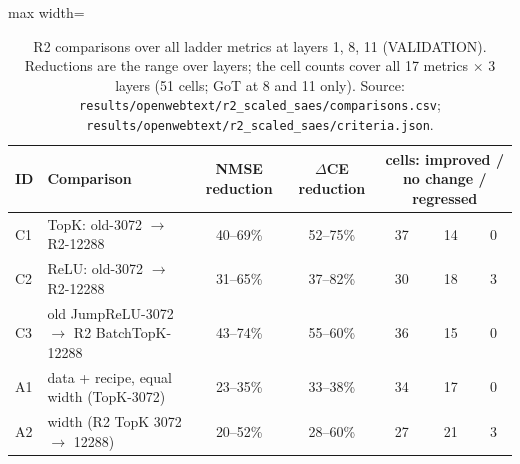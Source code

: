 \begin{table}[t]
\centering
\small
\caption{R2 comparisons over all ladder metrics at layers 1, 8, 11 (VALIDATION). Reductions are the range over layers; the cell counts cover all 17 metrics $\times$ 3 layers (51 cells; GoT at 8 and 11 only). Source: \texttt{results/\allowbreak{}openwebtext/\allowbreak{}r2\_scaled\_saes/\allowbreak{}comparisons.csv}; \texttt{results/\allowbreak{}openwebtext/\allowbreak{}r2\_scaled\_saes/\allowbreak{}criteria.json}.}
\label{tab:r2_counts}
\begin{adjustbox}{max width=\linewidth}
\begin{tabular}{llccccc}
\toprule
ID & Comparison & NMSE reduction & $\Delta$CE reduction & \multicolumn{3}{c}{cells: improved / no change / regressed} \\
\midrule
C1 & TopK: old-3072 $\rightarrow$ R2-12288 & 40--69\% & 52--75\% & 37 & 14 & 0 \\
C2 & ReLU: old-3072 $\rightarrow$ R2-12288 & 31--65\% & 37--82\% & 30 & 18 & 3 \\
C3 & old JumpReLU-3072 $\rightarrow$ R2 BatchTopK-12288 & 43--74\% & 55--60\% & 36 & 15 & 0 \\
A1 & data + recipe, equal width (TopK-3072) & 23--35\% & 33--38\% & 34 & 17 & 0 \\
A2 & width (R2 TopK 3072 $\rightarrow$ 12288) & 20--52\% & 28--60\% & 27 & 21 & 3 \\
\bottomrule
\end{tabular}
\end{adjustbox}
\end{table}
